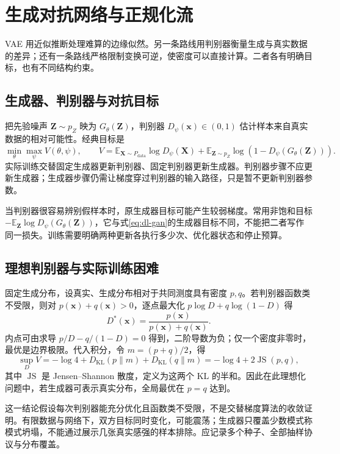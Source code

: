 \documentclass[UTF8,12pt,a4paper,fontset=fandol]{ctexbook}
\begin{document}
\chapter{生成对抗网络与正规化流}
\label{chap:dl-gan-flow}
VAE 用近似推断处理难算的边缘似然。另一条路线用判别器衡量生成与真实数据的差异；还有一条路线严格限制变换可逆，使密度可以直接计算。二者各有明确目标，也有不同结构约束。

\section{生成器、判别器与对抗目标}
把先验噪声 $\mathbf Z\sim p_Z$ 映为 $G_\theta(\mathbf Z)$，判别器 $D_\psi(\mathbf x)\in(0,1)$ 估计样本来自真实数据的相对可能性。经典目标\cite{goodfellow2014}是
\begin{equation}
\min_\theta\max_\psi V(\theta,\psi),\qquad
V=\mathbb E_{\mathbf X\sim P_{\mathrm{data}}}\log D_\psi(\mathbf X)
+\mathbb E_{\mathbf Z\sim p_Z}\log(1-D_\psi(G_\theta(\mathbf Z))).
\label{eq:dl-gan}
\end{equation}
实际训练交替固定生成器更新判别器、固定判别器更新生成器。判别器步骤不应更新生成器；生成器步骤仍需让梯度穿过判别器的输入路径，只是暂不更新判别器参数。

当判别器很容易辨别假样本时，原生成器目标可能产生较弱梯度。常用非饱和目标 $-\mathbb E_{\mathbf Z}\log D_\psi(G_\theta(\mathbf Z))$，它与式\eqref{eq:dl-gan}的生成器目标不同，不能把二者写作同一损失。训练需要明确两种更新各执行多少次、优化器状态和停止预算。

\section{理想判别器与实际训练困难}
固定生成分布，设真实、生成分布相对于共同测度具有密度 $p,q$。若判别器函数类不受限，则对 $p(\mathbf x)+q(\mathbf x)>0$，逐点最大化 $p\log D+q\log(1-D)$ 得
\[
D^*(\mathbf x)=\frac{p(\mathbf x)}{p(\mathbf x)+q(\mathbf x)}.
\]
内点可由求导 $p/D-q/(1-D)=0$ 得到，二阶导数为负；仅一个密度非零时，最优是边界极限。代入积分，令 $m=(p+q)/2$，得
\[
\sup_DV=-\log4+D_{\mathrm{KL}}(p\|m)+D_{\mathrm{KL}}(q\|m)
=-\log4+2\operatorname{JS}(p,q),
\]
其中 $\operatorname{JS}$ 是 Jensen--Shannon 散度，定义为这两个 KL 的半和。因此在此理想化问题中，若生成器可表示真实分布，全局最优在 $p=q$ 达到。

这一结论假设每次判别器能充分优化且函数类不受限，不是交替梯度算法的收敛证明。有限数据与网络下，双方目标同时变化，可能震荡；生成器只覆盖少数模式称模式坍塌，不能通过展示几张真实感强的样本排除。应记录多个种子、全部抽样协议与分布覆盖。
\end{document}
